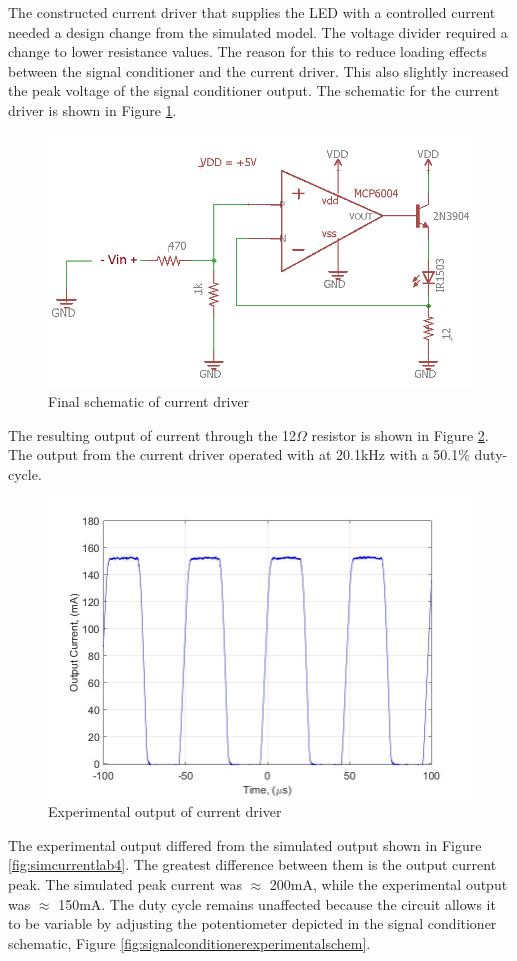 
	
The constructed current driver that supplies the LED with a controlled current needed a design change from the simulated model. The voltage divider required a change to lower resistance values. The reason for this to reduce loading effects between the signal conditioner and the current driver. This also slightly increased the peak voltage of the signal conditioner output. The schematic for the current driver is shown in Figure \ref{fig:leddriverexperimentalschem}.
\begin{figure}[H]
	\centering
	\includegraphics[width=0.6\linewidth]{ExperimentalImplementation/LEDDriverExperimentalSchem}
	\caption{Final schematic of current driver}
	\label{fig:leddriverexperimentalschem}
\end{figure}

The resulting output of current through the 12$\Omega$ resistor is shown in Figure \ref{fig:expcurrentlab4}.  The output from the current driver operated with at 20.1kHz with a 50.1\% duty-cycle.

\begin{figure}[H]
	\centering
	\includegraphics[width=0.6\linewidth]{ExperimentalImplementation/expcurrentlab4}
	\caption{Experimental output of current driver}
	\label{fig:expcurrentlab4}
\end{figure}

The experimental output differed from the simulated output shown in Figure \ref{fig:simcurrentlab4}. The greatest difference between them is the output current peak. The simulated peak current was $\approx$ 200mA, while the experimental output was $\approx$ 150mA. The duty cycle remains unaffected because the circuit allows it to be variable by adjusting the potentiometer depicted in the signal conditioner schematic, Figure \ref{fig:signalconditionerexperimentalschem}.   

